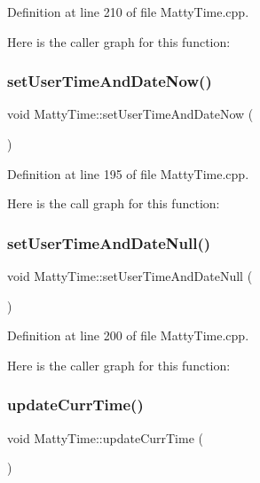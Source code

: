 Definition at line 210 of file Matty\+Time.\+cpp.

Here is the caller graph for this function\+:
\hypertarget{classMattyTime_afef585f71d11eed7777065af8ca0e9f0}{}\label{classMattyTime_afef585f71d11eed7777065af8ca0e9f0} 
\subsubsection{\texorpdfstring{set\+User\+Time\+And\+Date\+Now()}{setUserTimeAndDateNow()}}
{\footnotesize\ttfamily void Matty\+Time\+::set\+User\+Time\+And\+Date\+Now (\begin{DoxyParamCaption}{ }\end{DoxyParamCaption})}



Definition at line 195 of file Matty\+Time.\+cpp.

Here is the call graph for this function\+:
\hypertarget{classMattyTime_a6ae52c957bcf12e92624e09db890ce21}{}\label{classMattyTime_a6ae52c957bcf12e92624e09db890ce21} 
\subsubsection{\texorpdfstring{set\+User\+Time\+And\+Date\+Null()}{setUserTimeAndDateNull()}}
{\footnotesize\ttfamily void Matty\+Time\+::set\+User\+Time\+And\+Date\+Null (\begin{DoxyParamCaption}{ }\end{DoxyParamCaption})}



Definition at line 200 of file Matty\+Time.\+cpp.

Here is the caller graph for this function\+:
\hypertarget{classMattyTime_a52a7500e419fe56d10ddf2715fc96d06}{}\label{classMattyTime_a52a7500e419fe56d10ddf2715fc96d06} 
\subsubsection{\texorpdfstring{update\+Curr\+Time()}{updateCurrTime()}}
{\footnotesize\ttfamily void Matty\+Time\+::update\+Curr\+Time (\begin{DoxyParamCaption}{ }\end{DoxyParamCaption})\hspace{0.3cm}{\ttfamily [static]}}



